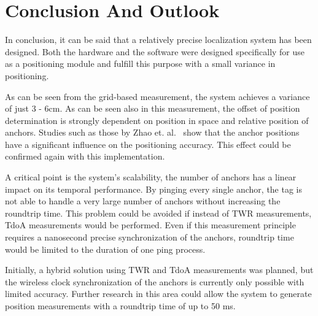 \documentclass[final, conference, a4paper]{IEEEtran}
\begin{document}

\section{Conclusion And Outlook}\label{section:conclusion}
In conclusion, it can be said that a relatively precise localization system has been designed.
Both the hardware and the software were designed specifically for use as a positioning module
and fulfill this purpose with a small variance in positioning.

As can be seen from the grid-based measurement, the system achieves a variance of just 3 - 6cm.
As can be seen also in this measurement,
the offset of position determination is strongly dependent on position in space
and relative position of anchors.
Studies such as those by Zhao et. al.~\cite{Zhao_2022} show that the anchor positions
have a significant influence on the positioning accuracy.
This effect could be confirmed again with this implementation.

A critical point is the system's scalability, the number of anchors has a linear impact on its temporal performance.
By pinging every single anchor, the tag is not able to handle a very large number of anchors without increasing the roundtrip time.
This problem could be avoided if instead of \ac{TWR} measurements, \ac{TdoA} measurements would be performed.
Even if this measurement principle requires a nanosecond precise synchronization of the anchors,
roundtrip time would be limited to the duration of one ping process.

Initially, a hybrid solution using \ac{TWR} and \ac{TdoA} measurements was planned,
but the wireless clock synchronization of the anchors is currently only possible with limited accuracy.
Further research in this area could allow the system to generate position measurements with a roundtrip time of up to 50 ms.




 
\end{document}
